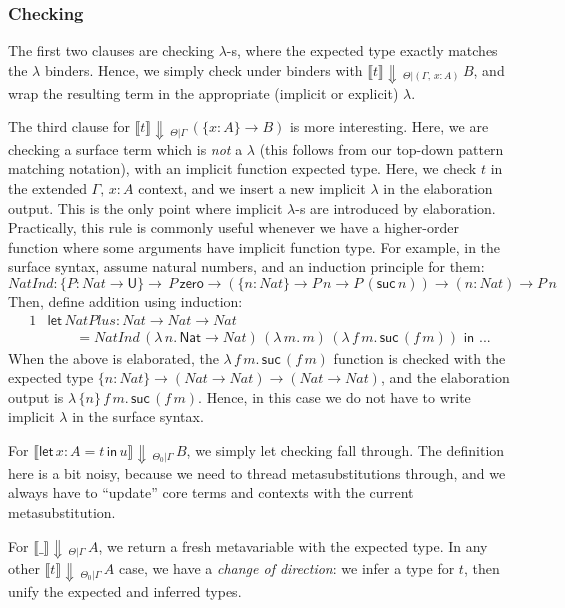 \documentclass[acmsmall,review,anonymous,prologue,dvipsnames]{acmart}\settopmatter{printfolios=true,printccs=false,printacmref=false}
\newcommand{\slet}{\boldsymbol{\mathsf{let}}}
\renewcommand{\sin}{\boldsymbol{\mathsf{in}}}
\renewcommand{\U}{\mathsf{U}}
\newcommand{\echeck}[4]{\llbracket#1\rrbracket\!\Downarrow\,_{#2|#3}\,#4}
\newcommand{\Nat}{\mathsf{Nat}}
\newcommand{\zero}{\mathsf{zero}}
\newcommand{\suc}{\mathsf{suc}}
\theoremstyle{remark}
\begin{document}
\subsubsection{Checking}
The first two clauses are checking $\lambda$-s, where the expected type exactly
matches the $\lambda$ binders. Hence, we simply check under binders with
$\echeck{t}{\Theta}{(\Gamma,\,x:A)} B$, and wrap the resulting term in the
appropriate (implicit or explicit) $\lambda$.

The third clause for $\echeck{t}{\Theta}{\Gamma}{(\{x : A\}\to B)}$ is more
interesting. Here, we are checking a surface term which is \emph{not} a
$\lambda$ (this follows from our top-down pattern matching notation), with an
implicit function expected type. Here, we check $t$ in the extended $\Gamma,\,x
: A$ context, and we insert a new implicit $\lambda$ in the elaboration
output. This is the only point where implicit $\lambda$-s are introduced by
elaboration. Practically, this rule is commonly useful whenever we have a
higher-order function where some arguments have implicit function type. For
example, in the surface syntax, assume natural numbers, and an induction
principle for them:
\[
NatInd : \{P : Nat \to \U\}\to \,P\,\zero \to (\{n : Nat\}\to P\,n \to
         P\,(\suc\,n)) \to (n : Nat) \to P\,n
\]
Then, define addition using induction:
\begin{alignat*}{1}
& \slet\, NatPlus : Nat \to Nat \to Nat\\
& \qquad = NatInd\,(\lambda\,n.\,\Nat\to Nat)\,(\lambda\,m.\,m)\,
                        (\lambda\,f\,m.\,\suc\,(f\,m))\,\,\sin\,\,...
\end{alignat*}
When the above is elaborated, the $\lambda\,f\,m.\,\suc\,(f\,m)$ function is
checked with the expected type $\{n : Nat\}\to (Nat \to Nat) \to (Nat \to Nat)$,
and the elaboration output is $\lambda\,\{n\}\,f\,m.\,\suc\,(f\,m)$.  Hence, in
this case we do not have to write implicit $\lambda$ in the surface syntax.

For $\echeck{\slet\,x:A=t\,\sin\,u}{\Theta_0}{\Gamma}{B}$, we simply let
checking fall through. The definition here is a bit noisy, because we need to
thread metasubstitutions through, and we always have to ``update'' core terms
and contexts with the current metasubstitution.

For $\echeck{\_}{\Theta}{\Gamma}{A}$, we return a fresh metavariable with the
expected type. In any other $\echeck{t}{\Theta_0}{\Gamma}{A}$ case, we have a
\emph{change of direction}: we infer a type for $t$, then unify the expected and
inferred types.
\end{document}
